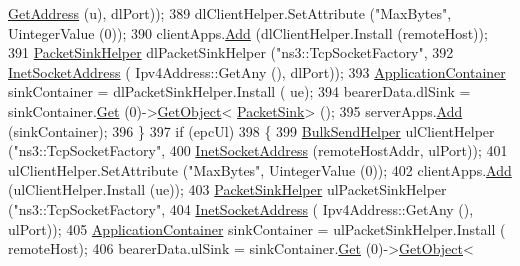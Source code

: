 \begin{DoxyCode}
      \hyperlink{classns3_1_1Ipv4InterfaceContainer_ae63208dcd222be986822937ee4aa828c}{GetAddress} (u), dlPort));
389                       dlClientHelper.SetAttribute (\textcolor{stringliteral}{"MaxBytes"}, UintegerValue (0));
390                       clientApps.\hyperlink{classns3_1_1ApplicationContainer_ad09ab1a1ad5849d518d5f4c262e38152}{Add} (dlClientHelper.Install (remoteHost));
391                       \hyperlink{classns3_1_1PacketSinkHelper}{PacketSinkHelper} dlPacketSinkHelper (\textcolor{stringliteral}{"ns3::TcpSocketFactory"},
392                                                            \hyperlink{classns3_1_1InetSocketAddress}{InetSocketAddress} (
      Ipv4Address::GetAny (), dlPort));
393                       \hyperlink{classns3_1_1ApplicationContainer}{ApplicationContainer} sinkContainer = dlPacketSinkHelper.Install (
      ue);
394                       bearerData.dlSink = sinkContainer.\hyperlink{classns3_1_1ApplicationContainer_a9e565807abd4213a56566a7ccd8d7509}{Get} (0)->\hyperlink{classns3_1_1Object_a13e18c00017096c8381eb651d5bd0783}{GetObject}<
      \hyperlink{classns3_1_1PacketSink}{PacketSink}> ();
395                       serverApps.\hyperlink{classns3_1_1ApplicationContainer_ad09ab1a1ad5849d518d5f4c262e38152}{Add} (sinkContainer);
396                     \}
397                   \textcolor{keywordflow}{if} (epcUl)
398                     \{
399                       \hyperlink{classns3_1_1BulkSendHelper}{BulkSendHelper} ulClientHelper (\textcolor{stringliteral}{"ns3::TcpSocketFactory"},
400                                                      \hyperlink{classns3_1_1InetSocketAddress}{InetSocketAddress} (remoteHostAddr, 
      ulPort));
401                       ulClientHelper.SetAttribute (\textcolor{stringliteral}{"MaxBytes"}, UintegerValue (0));
402                       clientApps.\hyperlink{classns3_1_1ApplicationContainer_ad09ab1a1ad5849d518d5f4c262e38152}{Add} (ulClientHelper.Install (ue));
403                       \hyperlink{classns3_1_1PacketSinkHelper}{PacketSinkHelper} ulPacketSinkHelper (\textcolor{stringliteral}{"ns3::TcpSocketFactory"},
404                                                            \hyperlink{classns3_1_1InetSocketAddress}{InetSocketAddress} (
      Ipv4Address::GetAny (), ulPort));
405                       \hyperlink{classns3_1_1ApplicationContainer}{ApplicationContainer} sinkContainer = ulPacketSinkHelper.Install (
      remoteHost);
406                       bearerData.ulSink = sinkContainer.\hyperlink{classns3_1_1ApplicationContainer_a9e565807abd4213a56566a7ccd8d7509}{Get} (0)->\hyperlink{classns3_1_1Object_a13e18c00017096c8381eb651d5bd0783}{GetObject}<

\end{DoxyCode}
